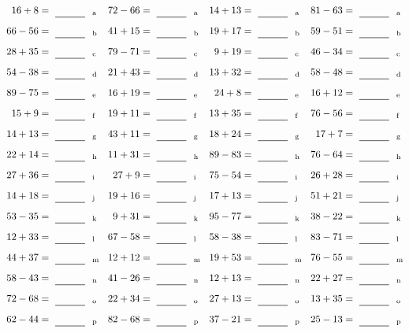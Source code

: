 \documentclass
[
  draft    = true,
  fontsize = 11pt,
  parskip  = half-
]
{scrartcl}
\begin{document}
\clearpage
\begin{align*}
    \pline{16+8}&=\rline{a}
  & \pline{72-66}&=\rline{a}
  & \pline{14+13}&=\rline{a}
  & \pline{81-63}&=\rline{a} \\[1ex]
    \pline{66-56}&=\rline{b}
  & \pline{41+15}&=\rline{b}
  & \pline{19+17}&=\rline{b}
  & \pline{59-51}&=\rline{b} \\[1ex]
    \pline{28+35}&=\rline{c}
  & \pline{79-71}&=\rline{c}
  & \pline{9+19}&=\rline{c}
  & \pline{46-34}&=\rline{c} \\[1ex]
    \pline{54-38}&=\rline{d}
  & \pline{21+43}&=\rline{d}
  & \pline{13+32}&=\rline{d}
  & \pline{58-48}&=\rline{d} \\[1ex]
    \pline{89-75}&=\rline{e}
  & \pline{16+19}&=\rline{e}
  & \pline{24+8}&=\rline{e}
  & \pline{16+12}&=\rline{e} \\[1ex]
    \pline{15+9}&=\rline{f}
  & \pline{19+11}&=\rline{f}
  & \pline{13+35}&=\rline{f}
  & \pline{76-56}&=\rline{f} \\[1ex]
    \pline{14+13}&=\rline{g}
  & \pline{43+11}&=\rline{g}
  & \pline{18+24}&=\rline{g}
  & \pline{17+7}&=\rline{g} \\[1ex]
    \pline{22+14}&=\rline{h}
  & \pline{11+31}&=\rline{h}
  & \pline{89-83}&=\rline{h}
  & \pline{76-64}&=\rline{h} \\[1ex]
    \pline{27+36}&=\rline{i}
  & \pline{27+9}&=\rline{i}
  & \pline{75-54}&=\rline{i}
  & \pline{26+28}&=\rline{i} \\[1ex]
    \pline{14+18}&=\rline{j}
  & \pline{19+16}&=\rline{j}
  & \pline{17+13}&=\rline{j}
  & \pline{51+21}&=\rline{j} \\[1ex]
    \pline{53-35}&=\rline{k}
  & \pline{9+31}&=\rline{k}
  & \pline{95-77}&=\rline{k}
  & \pline{38-22}&=\rline{k} \\[1ex]
    \pline{12+33}&=\rline{l}
  & \pline{67-58}&=\rline{l}
  & \pline{58-38}&=\rline{l}
  & \pline{83-71}&=\rline{l} \\[1ex]
    \pline{44+37}&=\rline{m}
  & \pline{12+12}&=\rline{m}
  & \pline{19+53}&=\rline{m}
  & \pline{76-55}&=\rline{m} \\[1ex]
    \pline{58-43}&=\rline{n}
  & \pline{41-26}&=\rline{n}
  & \pline{12+13}&=\rline{n}
  & \pline{22+27}&=\rline{n} \\[1ex]
    \pline{72-68}&=\rline{o}
  & \pline{22+34}&=\rline{o}
  & \pline{27+13}&=\rline{o}
  & \pline{13+35}&=\rline{o} \\[1ex]
    \pline{62-44}&=\rline{p}
  & \pline{82-68}&=\rline{p}
  & \pline{37-21}&=\rline{p}
  & \pline{25-13}&=\rline{p}
\end{align*}
\end{document}
